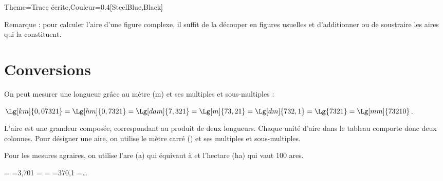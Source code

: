 \begin{Maquette}[Cours]{Theme={Trace écrite},Couleur={0.4[SteelBlue,Black]}}
      \bigskip

      Remarque : pour calculer l'aire d'une figure complexe, il suffit de la \og découper \fg{} en figures usuelles et d'additionner ou de soustraire les aires qui la constituent.


   \section{Conversions}

      On peut mesurer une longueur grâce au mètre (m) et ses multiples et sous-multiples :

      \vspace*{-10mm}

      \begin{exemple*}{}
         $\Lg[km]{0,07321} =\Lg[hm]{0,7321} =\Lg[dam]{7,321} =\Lg[m]{73,21} =\Lg[dm]{732,1} =\Lg{7321} =\Lg[mm]{73210}$. 
      \end{exemple*}

      L'aire est une grandeur composée, correspondant au produit de deux longueurs. Chaque unité d'aire dans le tableau comporte donc deux colonnes. Pour désigner une aire, on utilise le mètre carré (\Aire[m]{}) et ses multiples et sous-multiples. \par
      Pour les mesures agraires, on utilise l'are (a) qui équivaut à  et l'hectare (ha) qui vaut 100 ares. \smallskip

      \vspace*{-10mm}

      \begin{exemple*}{}
          = =3,701 = = =370,1  =\dots
      \end{exemple*}

\end{Maquette}


